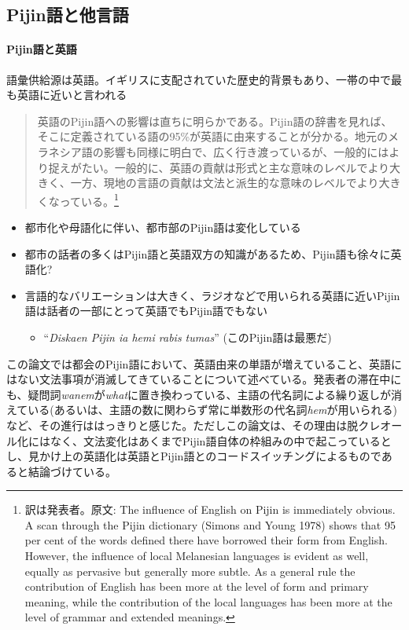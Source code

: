 \documentclass[11pt,a4paper]{jsarticle}
\begin{document}
\subsection{Pijin語と他言語}
\paragraph{Pijin語と英語} 語彙供給源は英語。イギリスに支配されていた歴史的背景もあり、一帯の中で最も英語に近いと言われる

\begin{quotation}
  英語のPijin語への影響は直ちに明らかである。Pijin語の辞書\citep{yumi}を見れば、そこに定義されている語の95\%が英語に由来することが分かる。地元のメラネシア語の影響も同様に明白で、広く行き渡っているが、一般的にはより捉えがたい。一般的に、英語の貢献は形式と主な意味のレベルでより大きく、一方、現地の言語の貢献は文法と派生的な意味のレベルでより大きくなっている。\citep{malaitan}\footnote{訳は発表者。原文: The influence of English on Pijin is immediately obvious. A scan through the Pijin dictionary (Simons and Young 1978) shows that 95 per cent of the words defined there have borrowed their form from English. However, the influence of local Melanesian languages is evident as well, equally as pervasive but generally more subtle. As a general rule the contribution of English has been more at the level of form and primary meaning, while the contribution of the local languages has been more at the level of grammar and extended meanings.}
\end{quotation}
\cite{nativization}
\begin{itemize}
  \item 都市化や母語化に伴い、都市部のPijin語は変化している
  \item 都市の話者の多くはPijin語と英語双方の知識があるため、Pijin語も徐々に英語化?
  \item 言語的なバリエーションは大きく、ラジオなどで用いられる英語に近いPijin語は話者の一部にとって英語でもPijin語でもない
  \begin{itemize}
    \item ``\textit{Diskaen Pijin ia hemi rabis tumas}'' (このPijin語は最悪だ)
  \end{itemize}
\end{itemize}

この論文では都会のPijin語において、英語由来の単語が増えていること、英語にはない文法事項が消滅してきていることについて述べている。発表者の滞在中にも、疑問詞\textit{wanem}が\textit{what}に置き換わっている、主語の代名詞による繰り返しが消えている(あるいは、主語の数に関わらず常に単数形の代名詞\textit{hem}が用いられる)など、その進行ははっきりと感じた。ただしこの論文は、その理由は脱クレオール化にはなく、文法変化はあくまでPijin語自体の枠組みの中で起こっているとし、見かけ上の英語化は英語とPijin語とのコードスイッチングによるものであると結論づけている。
\end{document}
